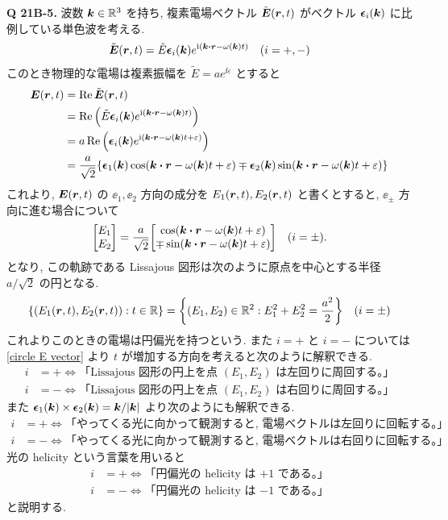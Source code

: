 \documentclass[a4paper,dvipdfmx]{jsarticle}
\theoremstyle{definition}
\begin{document}
\textbf{Q 21B-5.} 波数 $\vb*{k}\in\mathbb{R}^3$ を持ち, 複素電場ベクトル $\tilde{\vb*{E}}(\vb*{r}, t)$ がベクトル $\vb*{\epsilon}_i(\vb*{k})$ に比例している単色波を考える.
\begin{align}
  \tilde{\EE}(\rr, t) = \tilde{E}\ee_i(\kk)e^{\ii(\kk\vdot\rr-\omega(\kk)t)} \quad (i = +, -)
\end{align}
このとき物理的な電場は複素振幅を $\tilde{E} = ae^{\ii\varepsilon}$ とすると
\begin{align}
  \EE(\rr, t) & = \Re\tilde{\EE}(\rr, t)                                                                                                                        \\
              & = \Re\qty(\tilde{E}\ee_i(\kk)e^{\ii(\kk\vdot\rr - \omega(\kk)t)})                                                                               \\
              & = a\Re\qty(\ee_i(\kk)e^{\ii(\kk\vdot\rr - \omega(\kk)t + \varepsilon)})                                                                         \\
              & = \frac{a}{\sqrt{2}}\qty{\ee_1(\kk)\cos(\kk\vdot\rr - \omega(\kk)t + \varepsilon) \mp \ee_2(\kk)\sin(\kk\vdot\rr - \omega(\kk)t + \varepsilon)}
\end{align}
これより, $\vb*{E}(\vb*{r}, t)$ の $\ee_1, \ee_2$ 方向の成分を $E_1(\vb*{r}, t), E_2(\vb*{r}, t)$ と書くとすると, $\ee_\pm$ 方向に進む場合について
\begin{equation}
  \mqty[E_1 \\ E_2] = \frac{a}{\sqrt{2}}\mqty[\cos(\kk\vdot\rr - \omega(\kk)t + \varepsilon) \\ \mp\sin(\kk\vdot\rr - \omega(\kk)t + \varepsilon)] \quad (i = \pm). \label{circle E vector}
\end{equation}
となり, この軌跡である Lissajous 図形は次のように原点を中心とする半径 $a/\sqrt{2}$ の円となる.
\begin{align}
  \qty{\qty(E_1(\vb*{r}, t), E_2(\vb*{r}, t)):t\in\mathbb{R}} = \qty{\qty(E_1, E_2)\in\mathbb{R}^2:E_1^2 + E_2^2 = \frac{a^2}{2}} \quad (i=\pm)
\end{align}
これよりこのときの電場は円偏光を持つという. また $i = +$ と $i = -$ については \eqref{circle E vector} より $t$ が増加する方向を考えると次のように解釈できる.
\begin{align}
  i & = + \iff \text{「Lissajous 図形の円上を点 $(E_1, E_2)$ は左回りに周回する。」} \\
  i & = - \iff \text{「Lissajous 図形の円上を点 $(E_1, E_2)$ は右回りに周回する。」}
\end{align}
また $\vb*{\epsilon}_1(\vb*{k})\times\vb*{\epsilon}_2(\vb*{k}) = \vb*{k}/|\vb*{k}|$ より次のようにも解釈できる.
\begin{align}
  i & = + \iff \text{「やってくる光に向かって観測すると, 電場ベクトルは左回りに回転する。」} \\
  i & = - \iff \text{「やってくる光に向かって観測すると, 電場ベクトルは右回りに回転する。」}
\end{align}
光の helicity という言葉を用いると
\begin{align}
  i & = + \iff \text{「円偏光の helicity は $+1$ である。」} \\
  i & = - \iff \text{「円偏光の helicity は $-1$ である。」}
\end{align}
と説明する.
\end{document}

